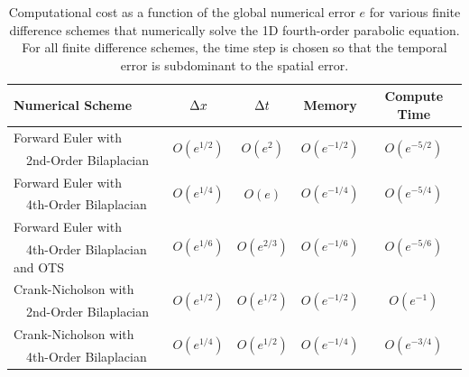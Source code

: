 \documentclass[fleqn,12pt,twoside]{article}
\begin{document}
\begin{table}[tb]
\caption{
Computational cost as a function of the global numerical error $e$
for various finite difference schemes that numerically solve the 1D 
fourth-order parabolic equation.  For all finite difference schemes, the 
time step is chosen so that the temporal error is subdominant to the spatial
error.
}
\label{tab:comp_perf_vs_err_4th_order_parabolic} 
\renewcommand{\arraystretch}{1.3}
\begin{tabular}{lcccc}
  \hline
  {\bf Numerical Scheme} & $\Delta x$ 
  & $\Delta t$
  & {\bf Memory}
  & {\bf Compute Time}
  \\
  \hline 
  Forward Euler with 
    & \multirow{2}{*}{$O\left( e^{1/2} \right)$} 
    & \multirow{2}{*}{$O\left( e^{2} \right)$}
    & \multirow{2}{*}{$O\left( e^{-1/2} \right)$} 
    & \multirow{2}{*}{$O\left( e^{-5/2} \right)$} \\
  \ \ 2nd-Order Bilaplacian & & & & \\
  Forward Euler with 
    & \multirow{2}{*}{$O\left( e^{1/4} \right)$}
    & \multirow{2}{*}{$O\left( e \right)$}
    & \multirow{2}{*}{$O\left( e^{-1/4} \right)$} 
    & \multirow{2}{*}{$O\left( e^{-{5/4}} \right)$} \\
  \ \ 4th-Order Bilaplacian & & & & \\
  Forward Euler with 
    & \multirow{2}{*}{$O\left( e^{1/6} \right)$} 
    & \multirow{2}{*}{$O\left( e^{2/3} \right)$} 
    & \multirow{2}{*}{$O\left( e^{-1/6} \right)$} 
    & \multirow{2}{*}{$O\left( e^{-5/6} \right)$} \\ 
  \ \ 4th-Order Bilaplacian and OTS & & & & \\
  Crank-Nicholson with 
    & \multirow{2}{*}{$O\left( e^{1/2} \right)$} 
    & \multirow{2}{*}{$O\left( e^{1/2} \right)$} 
    & \multirow{2}{*}{$O\left( e^{-1/2} \right)$} 
    & \multirow{2}{*}{$O\left( e^{-1} \right)$} \\
  \ \ 2nd-Order Bilaplacian & & & & \\
  Crank-Nicholson with 
    & \multirow{2}{*}{$O\left( e^{1/4} \right)$} 
    & \multirow{2}{*}{$O\left( e^{1/2} \right)$} 
    & \multirow{2}{*}{$O\left( e^{-1/4} \right)$} 
    & \multirow{2}{*}{$O\left( e^{-3/4} \right)$} \\
  \ \ 4th-Order Bilaplacian & & & & \\
  \hline
\end{tabular}
\end{table}
\end{document}
